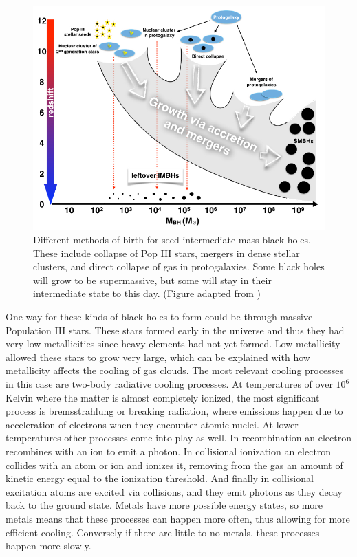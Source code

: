 \documentclass[english, oneside]{HYgradu}
\begin{document}
\begin{figure}
\centering
\includegraphics[width=\textwidth]{../images/imbhs.pdf}
\caption{Different methods of birth for seed intermediate mass black holes. These include collapse of Pop III stars, mergers in dense stellar clusters, and direct collapse of gas in protogalaxies. Some black holes will grow to be supermassive, but some will stay in their intermediate state to this day.
(Figure adapted from \citealt{mezcua:2017})}
\label{fig:imbhs}
\end{figure}

One way for these kinds of black holes to form could be through massive Population III stars. These stars formed early in the universe and thus they had very low metallicities since heavy elements had not yet formed. Low metallicity allowed these stars to grow very large, which can be explained with how metallicity affects the cooling of gas clouds. 
The most relevant cooling processes in this case are two-body radiative cooling processes. At temperatures of over $10^6$ Kelvin where the matter is almost completely ionized, the most significant process is bremsstrahlung or breaking radiation, where emissions happen due to acceleration of electrons when they encounter atomic nuclei. At lower temperatures other processes come into play as well. In recombination an electron recombines with an ion to emit a photon. In collisional ionization an electron collides with an atom or ion and ionizes it, removing from the gas an amount of kinetic energy equal to the ionization threshold. And finally in collisional excitation atoms are excited via collisions, and they emit photons as they decay back to the ground state. Metals have more possible energy states, so more metals means that these processes can happen more often, thus allowing for more efficient cooling. Conversely if there are little to no metals, these processes happen more slowly.
\end{document}
